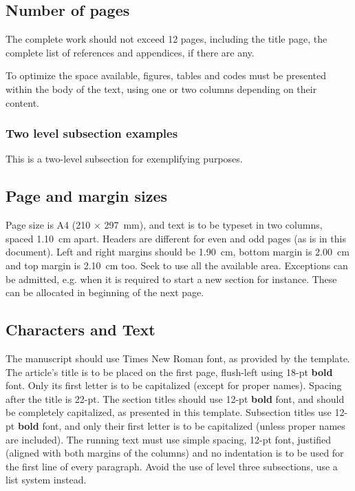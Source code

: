 \documentclass[12pt, a4paper, twoside, twocolumn]{article}
\begin{document}
\subsection{Number of pages}

The complete work should not exceed 12 pages, including the title page, the complete list of references and appendices, if there are any.

To optimize the space available, figures, tables and codes must be presented within the body  of the text, using one or two columns depending on their content.

\subsubsection{Two level subsection examples}

This is a two-level subsection for exemplifying purposes.

\subsection{Page and margin sizes}

Page size is A4 (210 $\times$ 297~mm), and text is to be typeset in two columns, spaced 1.10~cm apart. Headers are different for even and odd pages (as is in this document). Left and right margins should be 1.90~cm, bottom margin is 2.00~cm and top margin is 2.10~cm too. Seek to use all the available area. Exceptions can be admitted, e.g. when it is required  to start a new section for instance. These can be allocated in beginning of the next page.

\subsection{Characters and Text}

The manuscript should use Times New Roman font, as provided by the template. The article's title is to be placed on the first page, flush-left using  18-pt \textbf{bold} font. Only its first letter is to be capitalized (except for proper names). Spacing after the title is 22-pt. The section titles should use  12-pt \textbf{bold} font, and should be completely capitalized, as presented in this template. Subsection titles use 12-pt \textbf{bold} font, and  only their first letter is to be capitalized (unless proper names are included). The running text must use simple spacing, 12-pt font, justified (aligned with both margins of the columns) and no indentation is to be used for the first line of every paragraph. Avoid the use of level three subsections, use a list system instead.
\end{document}
